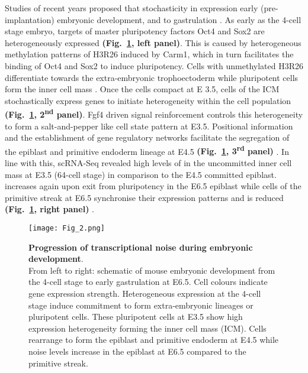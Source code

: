 Studies of recent years proposed that stochasticity in expression  early (pre-implantation) embryonic development, and to gastrulation \citep{Dietrich2007}. 
As early as the 4-cell stage embryo, targets of master pluripotency factors Oct4 and Sox2 are heterogeneously expressed \textbf{(Fig.~\ref{fig0:noise_development}, left panel)}. 
This is caused by heterogeneous methylation patterns of \gls{H3R26} induced by \gls{Carm1}, which in turn facilitates the binding of Oct4 and Sox2 to induce pluripotency. 
Cells with unmethylated H3R26 differentiate towards the extra-embryonic trophoectoderm while pluripotent cells form the inner cell mass \citep{Goolam2016}. 
Once the cells compact at \gls{E} 3.5, cells of the \gls{ICM} stochastically express genes to initiate heterogeneity within the cell population \textbf{(Fig.~\ref{fig0:noise_development}, 2\textsuperscript{nd} panel)}. 
Fgf4 driven signal reinforcement controls this heterogeneity to form a salt-and-pepper like cell state pattern at E3.5. 
Positional information and the establishment of gene regulatory networks facilitate the segregation of the epiblast and primitive endoderm lineage at E4.5 \textbf{(Fig.~\ref{fig0:noise_development}, 3\textsuperscript{rd} panel)} \citep{Ohnishi2014}. 
In line with this, scRNA-Seq revealed high levels of  in the uncommitted inner cell mass at E3.5 (64-cell stage) in comparison to the E4.5 committed epiblast. 
 increases again upon exit from pluripotency in the E6.5 epiblast while cells of the primitive streak at E6.5 synchronise their expression patterns and  is reduced \textbf{(Fig.~\ref{fig0:noise_development}, right panel)} \citep{Mohammed2017}. \cor{}

\begin{figure}[!h]
\centering
\texttt{[image: Fig\_2.png]}
\caption[Progression of transcriptional heterogeneity during embryonic development]{\textbf{Progression of transcriptional noise during embryonic development}.\\
From left to right: schematic of mouse embryonic development from the 4-cell stage to early gastrulation at E6.5. 
Cell colours indicate gene expression strength. Heterogeneous expression at the 4-cell stage induce commitment to form extra-embryonic lineages or pluripotent cells. 
These pluripotent cells at E3.5 show high expression heterogeneity forming the inner cell mass (ICM). 
Cells rearrange to form the epiblast and primitive endoderm at E4.5 while noise levels increase in the epiblast at E6.5 compared to the primitive streak.}
\label{fig0:noise_development}
\end{figure}

